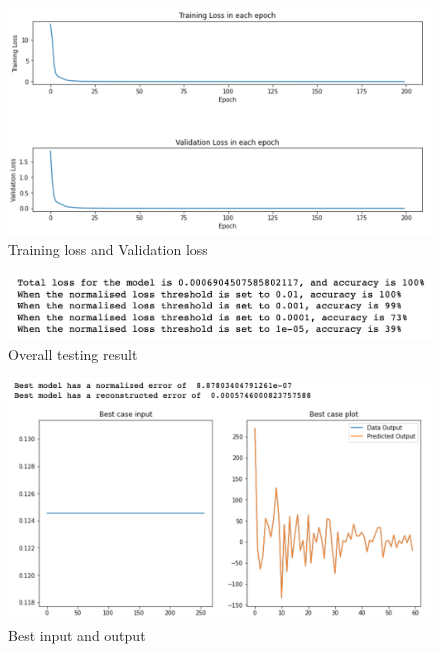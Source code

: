 \begin{figure}[H]
    \caption{Training loss and Validation loss}
    \includegraphics[scale=0.6]{Report LaTeX/figures/geoid_images/Geoid_trainingData.png}
\end{figure}

\begin{figure}[H]
    \caption{Overall testing result}
    \includegraphics[scale=0.8]{Report LaTeX/figures/geoid_images/Geoid_OverallTesting.png}
\end{figure}

\begin{figure}[H]
    \caption{Best input and output}
    \includegraphics[scale=0.6]{Report LaTeX/figures/geoid_images/Geoid_Best.png}
\end{figure}

